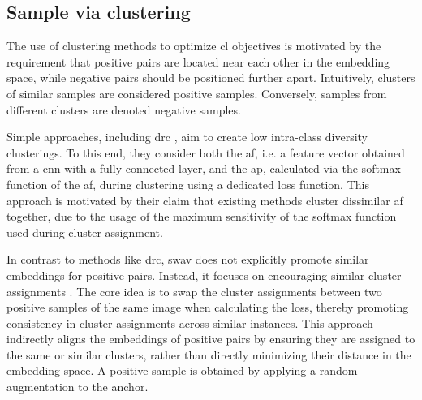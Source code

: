 \subsection{Sample via clustering}
\label{subsec:SampleViaClustering}

The use of clustering methods to optimize \ac{cl} objectives is motivated by 
the requirement that positive pairs are located near each other in the embedding space, 
while negative pairs should be positioned further apart.
Intuitively, clusters of similar samples are considered positive samples.
Conversely, samples from different clusters are denoted negative samples.

Simple approaches, including \ac{drc} \citep{DRC_2020}, aim to create low intra-class diversity clusterings. 
To this end, they consider both the \ac{af}, i.e. a feature vector obtained from a \ac{cnn} with a fully connected layer, 
and the \ac{ap}, calculated via the softmax function of the \ac{af}, 
during clustering using a dedicated loss function.
This approach is motivated by their claim that existing methods cluster dissimilar \ac{af} together,
due to the usage of the maximum sensitivity of the softmax function used during cluster assignment.

In contrast to methods like \ac{drc}, \ac{swav} does not explicitly promote similar embeddings for positive pairs. 
Instead, it focuses on encouraging similar cluster assignments \citep{swav_2020}. 
The core idea is to swap the cluster assignments between two positive samples of the same image when calculating the loss, 
thereby promoting consistency in cluster assignments across similar instances. 
This approach indirectly aligns the embeddings of positive pairs by 
ensuring they are assigned to the same or similar clusters, 
rather than directly minimizing their distance in the embedding space.
A positive sample is obtained by applying a random augmentation to the anchor.





